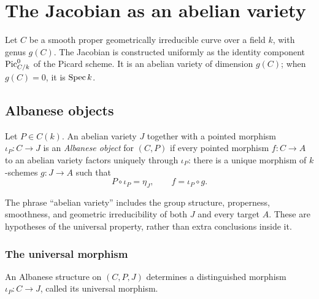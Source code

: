 \chapter{The Jacobian as an abelian variety}
\label{chap:Jacobian}

Let \(C\) be a smooth proper geometrically irreducible curve over a field
\(k\), with genus \(g(C)\).  The Jacobian is constructed uniformly as the
identity component \(\operatorname{Pic}^0_{C/k}\) of the Picard scheme.  It is an abelian
variety of dimension \(g(C)\); when \(g(C)=0\), it is \(\operatorname{Spec} k\).

\section{Albanese objects}

\begin{definition}\leanok
  \label{def:IsAlbanese}
  Let \(P \in C(k)\).  An abelian variety \(J\) together with a pointed
  morphism \(\iota_P \colon C \to J\) is an \emph{Albanese object} for
  \((C,P)\) if every pointed morphism \(f \colon C \to A\) to an abelian
  variety factors uniquely through \(\iota_P\): there is a unique morphism of
  \(k\)-schemes \(g \colon J \to A\) such that
  \[
    P \circ \iota_P = \eta_J,
    \qquad
    f = \iota_P \circ g.
  \]
\end{definition}

\begin{remark}
  \label{rem:IsAlbanese_typeclasses}
  The phrase ``abelian variety'' includes the group structure, properness,
  smoothness, and geometric irreducibility of both \(J\) and every target
  \(A\).  These are hypotheses of the universal property, rather than extra
  conclusions inside it.
\end{remark}

\subsection{The universal morphism}

\begin{definition}\leanok
  \label{def:IsAlbanese_ofCurve}
  An Albanese structure on \((C,P,J)\) determines a distinguished morphism
  \(\iota_P \colon C \to J\), called its universal morphism.
\end{definition}

